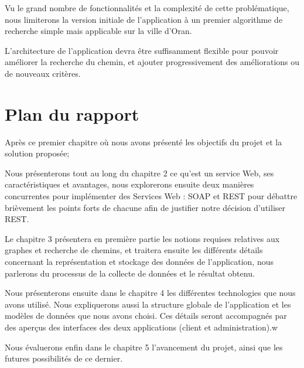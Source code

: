 Vu le grand nombre de fonctionnalités et la complexité de cette problématique, nous limiterons la version initiale de l'application à un premier algorithme de recherche simple mais applicable sur la ville d'Oran.

L'architecture de l'application devra être suffisamment flexible pour pouvoir améliorer la recherche du chemin, et ajouter progressivement des améliorations ou de nouveaux critères.

\section{Plan du rapport}

Après ce premier chapitre où nous avons présenté les objectifs du projet et la solution proposée;

Nous présenterons tout au long du chapitre 2 ce qu'est un service Web, ses caractéristiques et avantages, nous explorerons ensuite deux manières concurrentes pour implémenter des Services Web : SOAP et REST pour débattre brièvement les points forts de chacune afin de justifier notre décision d'utiliser REST.

Le chapitre 3 présentera en première partie les notions requises relatives aux graphes et recherche de chemins, et traitera ensuite les différents détails concernant la représentation et stockage des données de l'application, nous parlerons du processus de la collecte de données et le résultat obtenu.


Nous présenterons ensuite dans le chapitre 4 les différentes technologies que nous avons utilisé. Nous expliquerons aussi la structure globale de l'application et les modèles de données que nous avons choisi. Ces détails seront accompagnés par des aperçus des interfaces des deux applications (client et administration).w

Nous évaluerons enfin dans le chapitre 5 l'avancement du projet, ainsi que les futures possibilités de ce dernier.
